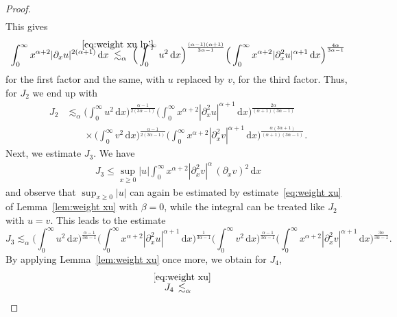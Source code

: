 \documentclass[10pt,a4paper]{amsart}
\renewcommand{\d}{\ensuremath{\mathrm{d}}}
\begin{document}
\begin{proof}
\begin{align*}
\end{align*}
%
This gives
%
\begin{equation*}
    \int_0^\infty x^{\alpha+2} |\partial_x u|^{2(\alpha+1)}\, \d x
    \; \stackrel{\mathclap{\eqref{eq:weight xu lp'}}}{\lesssim}_\alpha \;
    \Big(\int_0^\infty u^2\, \d x\Big)^\frac{(\alpha-1)(\alpha+1)}{3\alpha-1}
    \Big(
    \int_0^\infty x^{\alpha+2} |\partial_x^2 u|^{\alpha+1}\, \d x
    \Big)^\frac{4\alpha}{3\alpha-1}
\end{equation*}
%
for the first factor and the same, with $u$ replaced by $v$, for the third factor. Thus, for $J_2$ we end up with
\begin{align}\nonumber
    J_2
    & \lesssim_\alpha
    \Big(\int_0^\infty
    u^2\, \d x
    \Big)^\frac{\alpha-1}{2(3\alpha-1)}
    \Big(\int_0^\infty
    x^{\alpha+2} |\partial_x^2 u|^{\alpha+1}\, \d x
    \Big)^\frac{2\alpha}{(\alpha+1)(3\alpha-1)} \\
    & \phantom{\lesssim_\alpha} \times \Big(\int_0^\infty
    v^2\, \d x
    \Big)^\frac{\alpha-1}{2(3\alpha-1)} 
    \Big(\int_0^\infty
    x^{\alpha+2} |\partial_x^2 v|^{\alpha+1}\, \d x
    \Big)^\frac{\alpha(3\alpha+1)}{(\alpha+1)(3\alpha-1)}. \label{eq:N(v)u_J2}
\end{align}
%
Next, we estimate $J_3$. We have
%
\begin{equation*}
\begin{split}
    J_3
    \leq
    \sup_{x \geq 0} |u| 
    \int_0^\infty x^{\alpha+2} |\partial_x^2 v|^\alpha\, (\partial_x v)^2\, \d x
\end{split}
\end{equation*}
%
and observe that $\sup_{x \geq 0} |u|$ can again be estimated by estimate~\eqref{eq:weight xu} of Lemma~\ref{lem:weight xu} with $\beta=0$, while the integral can be treated like $J_2$ with $u=v$. This leads to the estimate
%
\begin{equation}\label{eq:N(v)u_J3}
    J_3
    \lesssim_\alpha
    \Big(\int_0^\infty u^2\, \d x\Big)^\frac{\alpha-1}{3\alpha-1}
    \Big(\int_0^\infty x^{\alpha+2} |\partial_x^2 u|^{\alpha+1} \, \d x\Big)^\frac{1}{3\alpha-1}
    \Big(\int_0^\infty
    v^2\, \d x
    \Big)^\frac{\alpha-1}{3\alpha-1} 
    \Big(\int_0^\infty
    x^{\alpha+2} |\partial_x^2 v|^{\alpha+1}\, \d x
    \Big)^\frac{3\alpha}{3\alpha-1}.
\end{equation}
%
By applying Lemma~\ref{lem:weight xu} once more, we obtain for $J_4$,
%
\begin{equation} \label{eq:N(v)u_J4}
    J_4 
    \, \stackrel{\mathclap{\eqref{eq:weight xu}}}{\lesssim}_\alpha 

\end{equation}
\end{proof}
\end{document}
